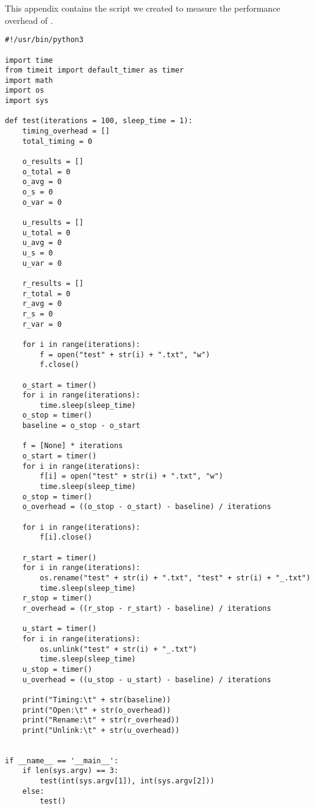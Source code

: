 \label{app:B}


\selectfont
This appendix contains the script we created to measure the performance overhead of .
\selectfont
\begin{lstlisting}[style=CStyle]
#!/usr/bin/python3

import time
from timeit import default_timer as timer
import math
import os
import sys

def test(iterations = 100, sleep_time = 1):
	timing_overhead = []
	total_timing = 0

	o_results = []
	o_total = 0
	o_avg = 0
	o_s = 0
	o_var = 0

	u_results = []
	u_total = 0
	u_avg = 0
	u_s = 0
	u_var = 0

	r_results = []
	r_total = 0
	r_avg = 0
	r_s = 0
	r_var = 0

	for i in range(iterations):
		f = open("test" + str(i) + ".txt", "w")
		f.close()

	o_start = timer()
	for i in range(iterations):
		time.sleep(sleep_time)
	o_stop = timer()
	baseline = o_stop - o_start

	f = [None] * iterations
	o_start = timer()
	for i in range(iterations):
		f[i] = open("test" + str(i) + ".txt", "w")
		time.sleep(sleep_time)
	o_stop = timer()
	o_overhead = ((o_stop - o_start) - baseline) / iterations

	for i in range(iterations):
		f[i].close()

	r_start = timer()
	for i in range(iterations):
		os.rename("test" + str(i) + ".txt", "test" + str(i) + "_.txt")
		time.sleep(sleep_time)
	r_stop = timer()
	r_overhead = ((r_stop - r_start) - baseline) / iterations

	u_start = timer()
	for i in range(iterations):
		os.unlink("test" + str(i) + "_.txt")
		time.sleep(sleep_time)
	u_stop = timer()
	u_overhead = ((u_stop - u_start) - baseline) / iterations

	print("Timing:\t" + str(baseline))
	print("Open:\t" + str(o_overhead))
	print("Rename:\t" + str(r_overhead))
	print("Unlink:\t" + str(u_overhead))


if __name__ == '__main__':
	if len(sys.argv) == 3:
		test(int(sys.argv[1]), int(sys.argv[2]))
	else:
		test()

\end{lstlisting}

